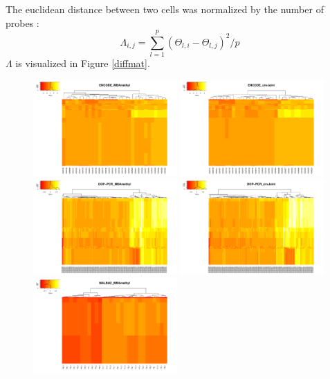 \documentclass[11pt]{article}
\begin{document}
The euclidean distance between two cells was normalized by the number of probes : 
$$\Lambda_{i,j} = \sum_{l=1}^{p} (\Theta_{l, i} - \Theta_{l, j})^2 / p$$
$\Lambda$ is visualized in Figure \ref{diffmat}.


\begin{figure}[h]
\centering
\includegraphics[width=0.49\textwidth]{encode_MBAmethyl_theta_heat.pdf}
\includegraphics[width=0.49\textwidth]{encode_cnvJoint_theta_heat.pdf}\\
\includegraphics[width=0.49\textwidth]{poly_MBAmethyl_theta_heat.pdf}
\includegraphics[width=0.49\textwidth]{poly_cnvJoint_theta_heat.pdf}\\
\includegraphics[width=0.49\textwidth]{lung_MBAmethyl_theta_heat.pdf}

\end{figure}
\end{document}
